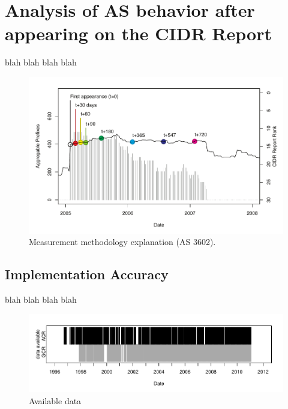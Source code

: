 \section{Analysis of AS behavior after appearing on the CIDR Report}

blah blah blah blah

\begin{figure}
    \includegraphics[width=6in]{figures/single_as.pdf}
    \caption{Measurement methodology explanation (AS 3602).}
\end{figure}


\subsection{Implementation Accuracy}

blah blah blah blah

\begin{figure}
    \includegraphics[width=6in]{figures/data_avail.pdf}
    \caption{Available data}
\end{figure}

